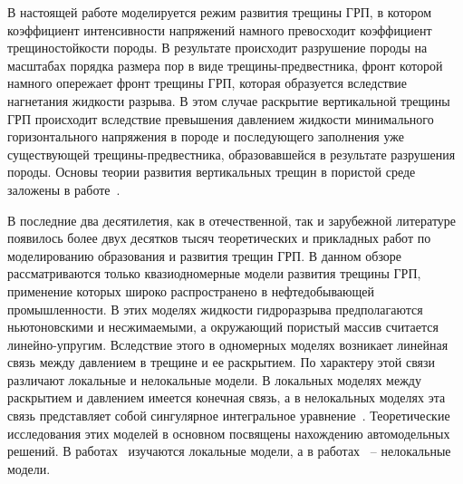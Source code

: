 








В настоящей работе моделируется режим развития трещины ГРП, в котором коэффициент интенсивности напряжений намного превосходит коэффициент трещиностойкости породы. В результате происходит разрушение породы на масштабах порядка размера пор в виде трещины-предвестника, фронт которой намного опережает фронт трещины ГРП, которая образуется вследствие нагнетания жидкости разрыва. В этом случае раскрытие вертикальной трещины ГРП происходит вследствие превышения давлением жидкости минимального горизонтального напряжения в породе и последующего заполнения уже существующей трещины-предвестника, образовавшейся в результате разрушения породы. Основы теории развития вертикальных трещин в пористой среде заложены в работе~\cite{Zheltov-Christ}.



В последние два десятилетия, как в отечественной, так и зарубежной литературе появилось более двух десятков тысяч теоретических и прикладных работ по моделированию образования и развития трещин ГРП. В данном обзоре рассматриваются только квазиодномерные модели развития трещины ГРП, применение которых широко распространено в нефтедобывающей промышленности. В этих моделях жидкости гидроразрыва предполагаются ньютоновскими и несжимаемыми, а окружающий пористый массив считается линейно-упругим. Вследствие этого в одномерных моделях возникает линейная связь между давлением в трещине и ее раскрытием. По характеру этой связи различают локальные и нелокальные модели. В локальных моделях между раскрытием и давлением имеется конечная связь, а в нелокальных моделях эта связь представляет собой сингулярное интегральное уравнение~\cite{Mush}. Теоретические исследования этих моделей в основном посвящены нахождению автомодельных решений. В работах~\cite{Perkins_Kern, Nordgren1, Iv_Sm1, Basn1}  изучаются локальные модели, а в работах~\cite{Teod_tr1,Garagash1,Garagash2, Adachi1,Mitchell1} – нелокальные модели.



